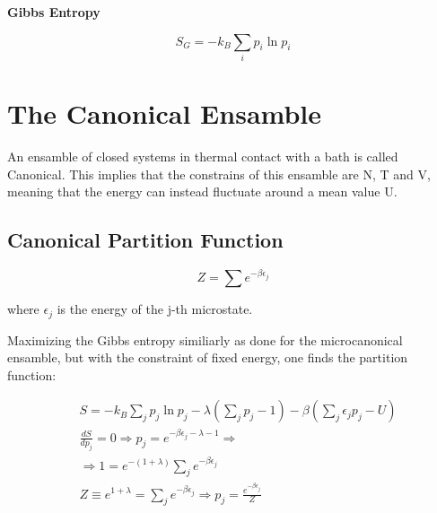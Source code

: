 \documentclass{article}
\begin{document}
\newpage

\begin{tcolorbox}[colframe=gray!90, colback=gray!5, coltitle=white, sharp corners, title=\textbf{Microcanonical Ensamble, Summary}, fonttitle=\large\bfseries]
    \textbf{Gibbs Entropy}
    \vspace{0.5em}

    \begin{equation}
        S_G = -k_B \sum_{i} p_i \ln{p_i}
    \end{equation}
\end{tcolorbox}

\newpage

\section{The Canonical Ensamble}

An ensamble of closed systems in thermal contact with a bath is called Canonical.
This implies that the constrains of this ensamble are N, T and V, meaning that the
energy can instead fluctuate around a mean value U.

\subsection{Canonical Partition Function}

\begin{tcolorbox}[colframe=gray!50, colback=gray!10, coltitle=black, title=Canonical Partition Function]
    \begin{equation}
        Z = \sum e^{-\beta \epsilon_j}
    \end{equation}

    where $\epsilon_j$ is the energy of the j-th microstate.
\end{tcolorbox}

Maximizing the Gibbs entropy similiarly as done for the microcanonical ensamble, but with the constraint of fixed energy, one finds the partition function:

\begin{align*}
     & S= -k_B\sum_{j}p_j\ln{p_j}-\lambda\left(\sum_{j}p_j-1\right)-\beta\left(\sum_{j}\epsilon_jp_j-U\right) \\
     & \frac{dS}{dp_j}=0 \Longrightarrow p_j=e^{-\beta\epsilon_j-\lambda-1} \Longrightarrow                   \\
     & \Longrightarrow 1=e^{-(1+\lambda)}\sum_{j}e^{-\beta\epsilon_j}                                         \\
     & Z\equiv e^{1+\lambda}=\sum_{j}e^{-\beta\epsilon_j} \Longrightarrow p_j=\frac{e^{-\beta\epsilon_j}}{Z}
\end{align*}
\end{document}
